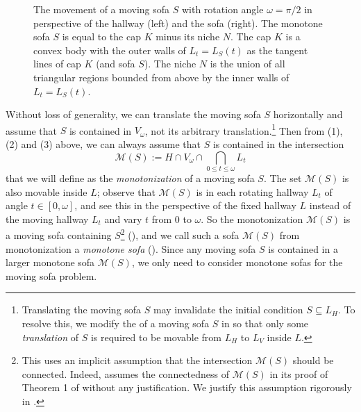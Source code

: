 \begin{figure}
\centering

\caption{The movement of a moving sofa \(S\) with rotation angle \(\omega = \pi/2\) in perspective of the hallway (left) and the sofa (right). The monotone sofa \(S\) is equal to the cap \(K\) minus its niche \(N\). The cap \(K\) is a convex body with the outer walls of \(L_t = L_S(t)\) as the tangent lines of cap \(K\) (and sofa \(S\)). The niche \(N\) is the union of all triangular regions bounded from above by the inner walls of \(L_t = L_S(t)\).}
\label{fig:monotone-sofa}
\end{figure}

Without loss of generality, we can translate the moving sofa \(S\) horizontally and assume that \(S\) is contained in \(V_\omega\), not its arbitrary translation.\footnote{Translating the moving sofa \(S\) may invalidate the initial condition \(S \subseteq L_H\). To resolve this, we modify the  of a moving sofa \(S\) in so that only some \emph{translation} of \(S\) is required to be movable from \(L_H\) to \(L_V\) inside \(L\).} Then from (1), (2) and (3) above, we can always assume that \(S\) is contained in the intersection
\begin{equation}
\label{eqn:monotone}
\mathcal{M}(S) := H \cap V_\omega \cap \bigcap_{0 \leq t \leq \omega} L_t
\end{equation}
that we will define as the \emph{monotonization} of a moving sofa \(S\). The set \(\mathcal{M}(S)\) is also movable inside \(L\); observe that \(\mathcal{M}(S)\) is in each rotating hallway \(L_t\) of angle \(t \in [0, \omega]\), and see this in the perspective of the fixed hallway \(L\) instead of the moving hallway \(L_t\) and vary \(t\) from \(0\) to \(\omega\). So the monotonization \(\mathcal{M}(S)\) is a moving sofa containing \(S\)\footnote{This uses an implicit assumption that the intersection \(\mathcal{M}(S)\) should be connected. Indeed, \autocite{gerverMovingSofaCorner1992} assumes the connectedness of \(\mathcal{M}(S)\) in its proof of Theorem 1 of \autocite{gerverMovingSofaCorner1992} without any justification. We justify this assumption rigorously in .} (), and we call such a sofa \(\mathcal{M}(S)\) from monotonization a \emph{monotone sofa} (). Since any moving sofa \(S\) is contained in a larger monotone sofa \(\mathcal{M}(S)\), we only need to consider monotone sofas for the moving sofa problem.